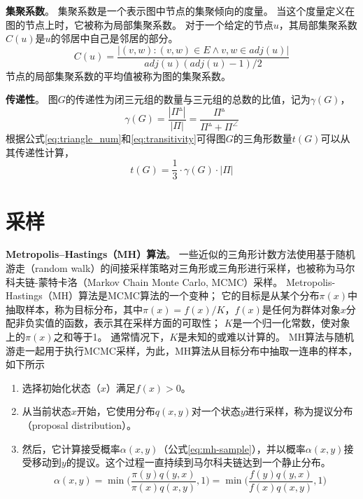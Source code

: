 \textbf{集聚系数}。
集聚系数是一个表示图中节点的集聚倾向的度量。
当这个度量定义在图的节点上时，它被称为局部集聚系数。
对于一个给定的节点$u$，其局部集聚系数$C(u)$是$u$的邻居中自己是邻居的部分。
\begin{equation}
    C(u)=\frac{|(v,w):(v,w)\in E\land v,w\in adj(u)|}{adj(u)(adj(u)-1)/2}
    \label{eq:clustering_coef}
\end{equation}
节点的局部集聚系数的平均值被称为图的集聚系数。

\textbf{传递性}。
图$G$的传递性为闭三元组的数量与三元组的总数的比值，记为$\gamma(G)$，
\begin{equation}
    \gamma(G)=\frac{|\Pi^\vartriangle|}{|\Pi|}=\frac{\Pi^\vartriangle}{\Pi^\vartriangle+\Pi^\angle}
    \label{eq:transitivity}
\end{equation}
根据公式\ref{eq:triangle_num}和\ref{eq:transitivity}可得图$G$的三角形数量$t(G)$可以从其传递性计算，
\begin{equation}
    t(G)=\frac{1}{3}\cdot \gamma(G) \cdot |\Pi| 
    \label{eq:tc_trans}
\end{equation}

\section{采样}

\textbf{Metropolis–Hastings（MH）算法}。
一些近似的三角形计数方法使用基于随机游走（random walk）的间接采样策略对三角形或三角形进行采样，也被称为马尔科夫链-蒙特卡洛（Markov Chain Monte Carlo, MCMC）采样。
Metropolis-Hastings（MH）算法是MCMC算法的一个变种；
它的目标是从某个分布$\pi(x)$中抽取样本，称为目标分布，其中$\pi(x)=f(x)/K$，$f(x)$是任何为群体对象$x$分配非负实值的函数，表示其在采样方面的可取性；
$K$是一个归一化常数，使对象上的$\pi(x)$之和等于1。
通常情况下，$K$是未知的或难以计算的。
MH算法与随机游走一起用于执行MCMC采样，为此，MH算法从目标分布中抽取一连串的样本，如下所示
\begin{enumerate}
    \item 选择初始化状态（$x$）满足$f(x)>0$。
    \item 从当前状态$x$开始，它使用分布$q(x, y)$对一个状态$y$进行采样，称为提议分布（proposal distribution）。
    \item 然后，它计算接受概率$\alpha (x,y)$（公式\ref{eq:mh-sample}），并以概率$\alpha (x,y)$接受移动到$y$的提议。这个过程一直持续到马尔科夫链达到一个静止分布。
    \begin{equation}
        \alpha (x,y)=\min\Bigg(\frac{\pi(y)q(y,x)}{\pi(x)q(x,y)},1 \Bigg)=\min\Bigg(\frac{f(y)q(y,x)}{f(x)q(x,y)},1 \Bigg)
        \label{eq:mh-sample}
    \end{equation}
\end{enumerate}

